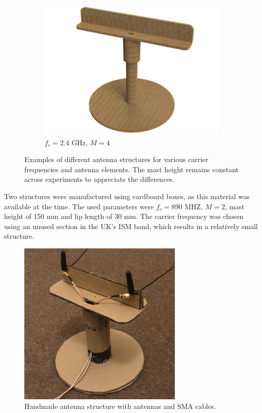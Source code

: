 \documentclass[12pt,a4paper]{report}
\begin{document}
\begin{figure}[h]
\begin{subfigure}{0.3\textwidth}
        \includegraphics[width = \textwidth]{Figures/tb_cad_2400.png}
        \caption{$f_c = 2.4 \text{ GHz}$, $M = 4$}
    \end{subfigure}
    \caption[Antenna holder example structures.]{Examples of different antenna structures for various carrier frequencies and antenna elements. The mast height remains constant across experiments to appreciate the differences.}
    \label{fig:tb_cad}
\end{figure}

Two structures were manufactured using cardboard boxes, as this material was available at the time. The used parameters were $f_c = 890$ MHZ, $M = 2$, mast height of 150 mm and lip length of 30 mm. The carrier frequency was chosen using an unused section in the UK's ISM band, which results in a relatively small structure.

\begin{figure}[!]
    \centering
    \includegraphics[width = 0.7\textwidth]{Figures/tb_real.jpg}
    \caption{Handmade antenna structure with antennas and SMA cables.}
    \label{fig:tb_real}
\end{figure}
\end{document}
